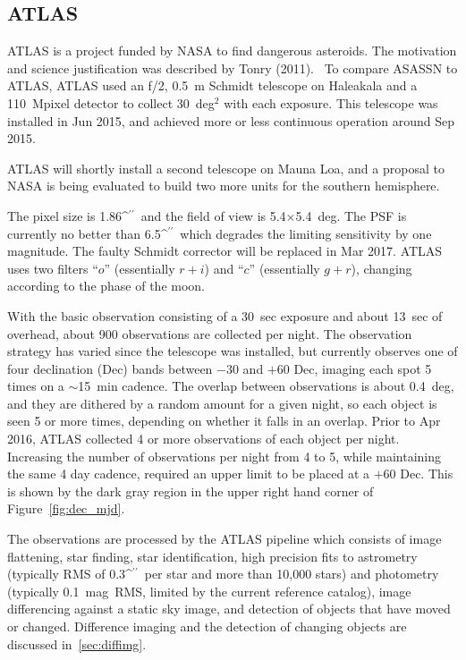 \documentclass[aps,prb,twocolumn,superscriptaddress]{revtex4-1}
\def\arcsec{\ifmmode^{\prime\prime}\else$^{\prime\prime}$\fi}
\begin{document}
\subsection{ATLAS}
ATLAS is a project funded by NASA to find dangerous asteroids.  The 
motivation and science justification was described by Tonry (2011).~\cite{ATLAS_data}  
%
%
To compare ASASSN to ATLAS, 
ATLAS used an f/2, 0.5~m Schmidt telescope on Haleakala and a 
110~Mpixel detector to collect 30~deg$^2$ with each exposure.  
%
%
This telescope was installed in Jun 
2015, and achieved more or less continuous operation around Sep 2015.  

ATLAS will shortly install a second telescope on Mauna Loa, and a 
proposal to NASA is being evaluated to build two more units for the 
southern hemisphere.

The pixel size is 1.86\arcsec\ and the field of view is
5.4$\times$5.4~deg.  The PSF is currently no better than 6.5\arcsec\
which degrades the limiting sensitivity by one magnitude.  The faulty
Schmidt corrector will be replaced in Mar 2017.  ATLAS uses two
filters ``$o$'' (essentially $r+i$) and ``$c$'' (essentially $g+r$),
changing according to the phase of the moon.

With the basic observation consisting of a 30~sec exposure and about 
13~sec of overhead, about 900 observations are collected per night.  
The observation strategy has varied since the telescope was 
installed, but currently observes one of four declination (Dec) bands between $-30$ 
and $+60$ Dec, imaging each spot 5 times on a $\sim$15~min cadence. 
The overlap between observations is about 0.4~deg, and they are 
dithered by a random amount for a given night, so each object is seen 
5 or more times, depending on whether it falls in an overlap.  
Prior to Apr 2016, ATLAS collected 4 or more observations of each object 
per night. Increasing the number of observations per night from 4 to 5, 
while maintaining the same 4 day cadence, required an upper limit to 
be placed at a $+60$ Dec. This is shown by the dark gray region in 
the upper right hand corner of Figure~\ref{fig:dec_mjd}. 

The observations are processed by the ATLAS pipeline which consists of 
image flattening, star finding, star identification, high precision 
fits to astrometry (typically RMS of 0.3\arcsec\ per star and more 
than 10,000 stars) and photometry (typically 0.1~mag~RMS, limited by 
the current reference catalog), image differencing against a static sky 
image, and detection of objects that have moved or changed.  
Difference imaging and the detection of changing objects 
are discussed in~\cref{sec:diffimg}.
\end{document}
